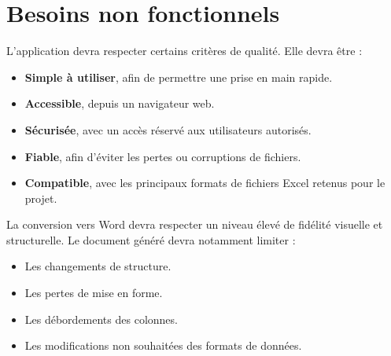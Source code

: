 \chapter{Besoins non fonctionnels}

L'application devra respecter certains critères de qualité. Elle devra être :

\begin{itemize}
    \item \textbf{Simple à utiliser}, afin de permettre une prise en main rapide.
    \item \textbf{Accessible}, depuis un navigateur web.
    \item \textbf{Sécurisée}, avec un accès réservé aux utilisateurs autorisés.
    \item \textbf{Fiable}, afin d'éviter les pertes ou corruptions de fichiers.
    \item \textbf{Compatible}, avec les principaux formats de fichiers Excel retenus pour le projet.
\end{itemize}

La conversion vers Word devra respecter un niveau élevé de fidélité visuelle et structurelle. Le document généré devra notamment limiter :

\begin{itemize}
    \item Les changements de structure.
    \item Les pertes de mise en forme.
    \item Les débordements des colonnes.
    \item Les modifications non souhaitées des formats de données.
\end{itemize}
